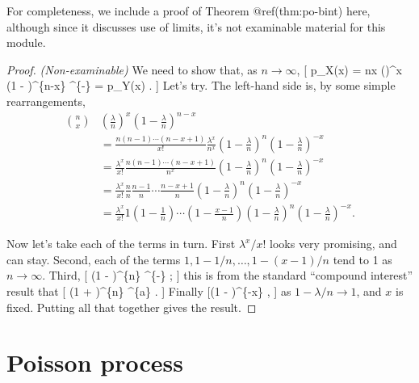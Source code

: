 \documentclass[
  letterpaper,
  DIV=11,
  numbers=noendperiod]{scrreprt}
\theoremstyle{remark}
\begin{document}
For completeness, we include a proof of Theorem @ref(thm:po-bint) here,
although since it discusses use of limits, it's not examinable material
for this module.

\begin{proof}

\emph{(Non-examinable)} We need to show that, as \(n \to \infty\), {[}
p\_X(x) = \binom nx \left(\right)\^{}x \left(1 -
\right)\^{}\{n-x\} \to {}\^{}\{-\lambda\}
 = p\_Y(x) . {]} Let's try. The left-hand side is,
by some simple rearrangements, \begin{align*}
\binom nx &\left(\frac{\lambda}{n}\right)^x \left(1 - \frac{\lambda}{n}\right)^{n-x} \\
  &= \frac{n(n-1)\cdots(n-x+1)}{x!} \frac{\lambda^x}{n^x} \left(1 - \frac{\lambda}{n}\right)^{n}\left(1 - \frac{\lambda}{n}\right)^{-x} \\
  &= \frac{\lambda^x}{x!} \frac{n(n-1)\cdots(n-x+1)}{n^x} \left(1 - \frac{\lambda}{n}\right)^{n}\left(1 - \frac{\lambda}{n}\right)^{-x} \\
  &= \frac{\lambda^x}{x!} \frac{n}{n} \frac{n-1}{n} \cdots \frac{n-x+1}{n} \left(1 - \frac{\lambda}{n}\right)^{n}\left(1 - \frac{\lambda}{n}\right)^{-x} \\
  &= \frac{\lambda^x}{x!} 1 \left(1 - \frac{1}{n}\right) \cdots \left(1 - \frac{x-1}{n}\right)  \left(1 - \frac{\lambda}{n}\right)^{n}\left(1 - \frac{\lambda}{n}\right)^{-x} .
\end{align*}

Now let's take each of the terms in turn. First \(\lambda^x / x!\) looks
very promising, and can stay. Second, each of the terms
\(1, 1 - 1/n, \dots, 1 - (x-1)/n\) tend to 1 as \(n \to \infty\). Third,
{[} \left(1 - \right)\^{}\{n\}
\to {}\^{}\{-\lambda\} ; {]} this is from the standard
``compound interest'' result that {[} \left(1 +
\right)\^{}\{n\} \to {}\^{}\{a\}
\qquad {}. {]} Finally {[}\left(1 -
\right)\^{}\{-x\}  , {]} as
\(1 - \lambda/n \to 1\), and \(x\) is fixed. Putting all that together
gives the result.

\end{proof}

\hypertarget{poisson-process}{%
\section{Poisson process}\label{poisson-process}}
\end{document}
